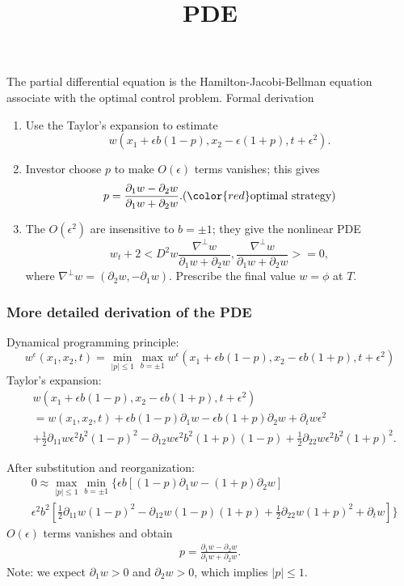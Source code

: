 \documentclass{beamer}
\begin{document}
\begin{frame}
\title{PDE}
The partial differential equation is the {\color{red}Hamilton-Jacobi-Bellman} equation associate with the optimal control problem.  Formal derivation 
\begin{enumerate}
	\item Use the Taylor's expansion to estimate
	$$w(x_1+\epsilon b(1-p),x_2-\epsilon(1+p),t+\epsilon^2).$$
	\item Investor choose $p$ to make $O(\epsilon)$ terms vanishes; this gives 
	$$p = \frac{\partial_1 w - \partial_2 w}{\partial_1 w + \partial_2 w}. ({\color{red}\text{optimal strategy}})$$ 
	\item The $O(\epsilon^2)$ are insensitive to $b = \pm 1$; they give the nonlinear PDE
	$$w_t + 2<D^2 w \frac{\nabla^\perp w}{\partial_1 w + \partial_2 w},\frac{\nabla^\perp w}{\partial_1 w+\partial_2 w}> = 0,$$
	where $\nabla^\perp w = (\partial_2 w,-\partial_1 w).$ Prescribe the final value $w = \phi$ at $T$.
\end{enumerate}
\end{frame}
\begin{frame}
\frametitle{More detailed derivation of the PDE}
Dynamical programming principle:
$$w^\epsilon(x_1,x_2,t) = \min_{|p|\le 1}\max_{b = \pm 1} w^\epsilon(x_1 + \epsilon b(1-p),x_2-\epsilon b(1+p),t+\epsilon^2)$$
Taylor's expansion:
\begin{align*}
&w(x_1 + \epsilon b(1-p),x_2-\epsilon b(1+p),t+\epsilon^2) \\
&= w(x_1,x_2,t) + \epsilon b(1-p)\partial_1w -\epsilon b(1+p)\partial_2 w+ \partial_t w\epsilon^2 \\
&+\frac{1}{2}\partial_{11}w\epsilon^2 b^2(1-p)^2-\partial_{12}w\epsilon^2 b^2(1+p)(1-p)+\frac{1}{2} \partial_{22}w\epsilon^2b^2(1+p)^2.
\end{align*}
\end{frame}

\begin{frame}
After substitution and reorganization:
\begin{align*}
&0\approx \max_{|p|\le 1}\min_{b = \pm 1}\{\epsilon b[(1-p)\partial_1 w-(1+p)\partial_2 w]\\
&\epsilon^2 b^2 [\frac{1}{2}\partial_{11}w(1-p)^2 -\partial_{12}w(1-p)(1+p) + \frac{1}{2}\partial_{22}w(1+p)^2 + \partial_t w]\}
\end{align*}
$O(\epsilon)$ terms vanishes and obtain
\begin{align*}
p = \frac{\partial_1 w-\partial_2 w}{\partial_1w +\partial_2 w}.
\end{align*}
Note: we expect $\partial_1 w >0$ and $\partial_2 w>0$, which implies $|p|\le 1$. 

\end{frame}
\end{document}
